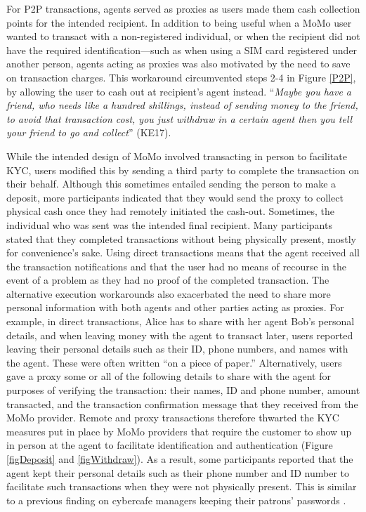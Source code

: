 For P2P transactions, agents served as proxies as users made them cash collection points for the intended recipient. In addition to being useful when a MoMo user wanted to transact with a non-registered individual, or when the recipient did not have the required identification---such as when using a SIM card registered under another person, agents acting as proxies was also motivated by the need to save on transaction charges. This workaround circumvented steps 2-4 in Figure \ref{P2P}, by allowing the user to cash out at recipient's agent instead. “\textit{Maybe you have a friend, who needs like a hundred shillings, instead of sending money to the friend, to avoid that transaction cost, you just withdraw in a certain agent then you tell your friend to go and collect}” (KE17).

While the intended design of MoMo involved transacting in person to facilitate KYC, users modified this by sending a third party to complete the transaction on their behalf. Although this sometimes entailed sending the person to make a deposit, more participants indicated that they would send the proxy to collect physical cash once they had remotely initiated the cash-out. Sometimes, the individual who was sent was the intended final recipient. Many participants stated that they completed transactions without being physically present, mostly for convenience's sake.
Using direct transactions means that the agent received all the transaction notifications and that the user had no means of recourse in the event of a problem as they had no proof of the completed transaction. The alternative execution workarounds also exacerbated the need to share more personal information with both agents and other parties acting as proxies. For example, in direct transactions, Alice has to share with her agent Bob's personal details, and when leaving money with the agent to transact later, users reported leaving their personal details such as their ID, phone numbers, and names with the agent. These were often written ``on a piece of paper.'' Alternatively, users gave a proxy some or all of the following details to share with the agent for purposes of verifying the transaction: their names, ID and phone number, amount transacted, and the transaction confirmation message that they received from the MoMo provider. Remote and proxy transactions therefore thwarted the KYC measures put in place by MoMo providers that require the customer to show up in person at the agent to facilitate identification and authentication (Figure \ref{figDeposit} and \ref{figWithdraw}). As a result, some participants reported that the agent kept their personal details such as their phone number and ID number to facilitate such transactions when they were not physically present. This is similar to a previous finding on cybercafe managers keeping their patrons' passwords \cite{munyendoeighty}.

